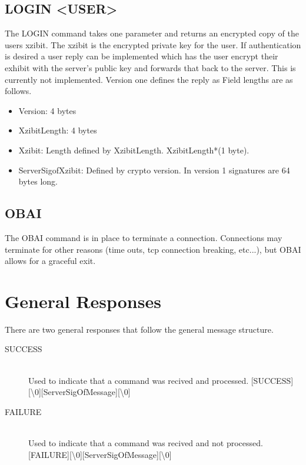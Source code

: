 \documentclass[a4paper,11pt]{article}
\begin{document}
\subsection{LOGIN <USER>}
The LOGIN command takes one parameter and returns an encrypted copy of the users xzibit. The xzibit is the encrypted private key for the user. If authentication is desired a user reply can be implemented which has the user encrypt their exhibit with the server's public key and forwards that back to the server. This is currently not implemented. Version one defines the reply as 
\newline
[Version][XzibitLength][Xzibit][ServerSigofXzibit]
Field lengths are as follows.
\begin{itemize}
  \item Version: 4 bytes
  \item XzibitLength: 4 bytes
  \item Xzibit: Length defined by XzibitLength. XzibitLength*(1 byte).
  \item ServerSigofXzibit: Defined by crypto version. In version 1 signatures are 64 bytes long.
\end{itemize}
\subsection{OBAI}
The OBAI command is in place to terminate a connection. Connections may terminate for other reasons (time outs, tcp connection breaking, etc...), but OBAI allows for a graceful exit. 

\section{General Responses}
There are two general responses that follow the general message structure.
\begin{description}
  \item [SUCCESS] \hfill \\
  Used to indicate that a command was recived and processed.
  [SUCCESS][\textbackslash 0][ServerSigOfMessage][\textbackslash 0]
  \item [FAILURE] \hfill \\
  Used to indicate that a command was recived and not processed.
  [FAILURE][\textbackslash 0][ServerSigOfMessage][\textbackslash 0]
\end{description}
\end{document}
